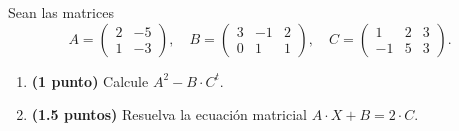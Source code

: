 
Sean las matrices
\[
A=\begin{pmatrix}2&-5\\1&-3\end{pmatrix},\quad
B=\begin{pmatrix}3&-1&2\\0&1&1\end{pmatrix},\quad
C=\begin{pmatrix}1&2&3\\-1&5&3\end{pmatrix}.
\]
\begin{enumerate}[label=\alph*)]
\item \textbf{(1 punto)} Calcule $A^2-B\cdot C^t$.
\item \textbf{(1.5 puntos)} Resuelva la ecuación matricial $A\cdot X+B=2\cdot C$.
\end{enumerate}
